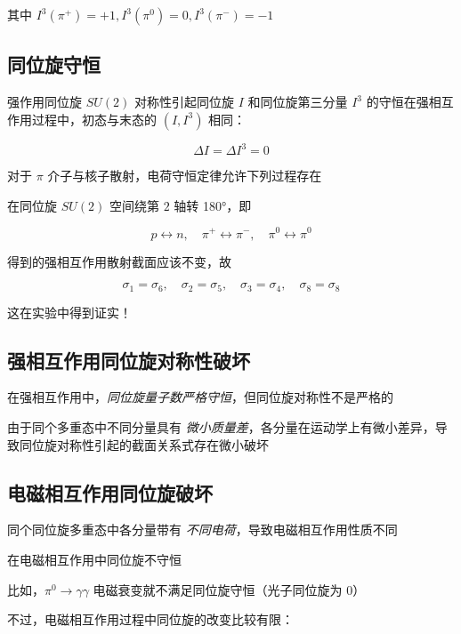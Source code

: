 其中 $I^3(\pi^+)=+1, I^3(\pi^0)=0, I^3(\pi^-)=-1$

\subsection{同位旋守恒}

强作用同位旋 $SU(2)$ 对称性引起同位旋 $I$ 和同位旋第三分量 $I^3$ 的守恒在强相互作用过程中，初态与末态的 $(I, I^3)$ 相同：

\begin{equation}
    \Delta I = \Delta I^3 = 0
\end{equation}

对于 $\pi$ 介子与核子散射，电荷守恒定律允许下列过程存在

在同位旋 $SU(2)$ 空间绕第 $2$ 轴转 \ang{180}，即

\begin{equation}
    p \leftrightarrow n, \quad \pi^+ \leftrightarrow \pi^-, \quad \pi^0 \leftrightarrow \pi^0
\end{equation}

得到的强相互作用散射截面应该不变，故

\begin{equation}
    \sigma_1 = \sigma_6, \quad \sigma_2 = \sigma_5, \quad \sigma_3 = \sigma_4, \quad \sigma_8 = \sigma_8
\end{equation}

这在实验中得到证实！

\subsection{强相互作用同位旋对称性破坏}

在强相互作用中，\emph{同位旋量子数严格守恒}，但同位旋对称性不是严格的

由于同个多重态中不同分量具有 \emph{微小质量差}，各分量在运动学上有微小差异，导致同位旋对称性引起的截面关系式存在微小破坏

\subsection{电磁相互作用同位旋破坏}

同个同位旋多重态中各分量带有 \emph{不同电荷}，导致电磁相互作用性质不同

在电磁相互作用中同位旋不守恒

比如，$\pi^0 \to \gamma\gamma$ 电磁衰变就不满足同位旋守恒（光子同位旋为 $0$）

不过，电磁相互作用过程中同位旋的改变比较有限：

